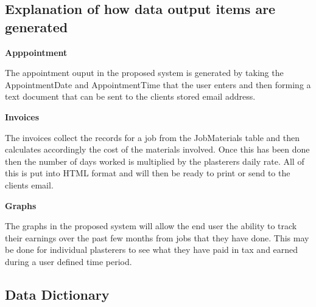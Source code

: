 \subsection{Explanation of how data output items are generated}

\textbf{Apppointment}
\begin{flushleft}
The appointment ouput in the proposed system is generated by taking the AppointmentDate and AppointmentTime that the user enters and then forming a text document that can be sent to the clients stored email address.
\end{flushleft}

\textbf{Invoices}
\begin{flushleft}
The invoices collect the records for a job from the JobMaterials table and then calculates accordingly the cost of the materials involved. Once this has been done then the number of days worked is multiplied by the plasterers daily rate. All of this is put into HTML format and will then be ready to print or send to the clients email.
\end{flushleft}

\textbf{Graphs}
\begin{flushleft}
The graphs in the proposed system will allow the end user the ability to track their earnings over the past few months from jobs that they have done. This may be done for individual plasterers to see what they have paid in tax and earned during a user defined time period.
\end{flushleft}


\pagebreak
\subsection{Data Dictionary}


